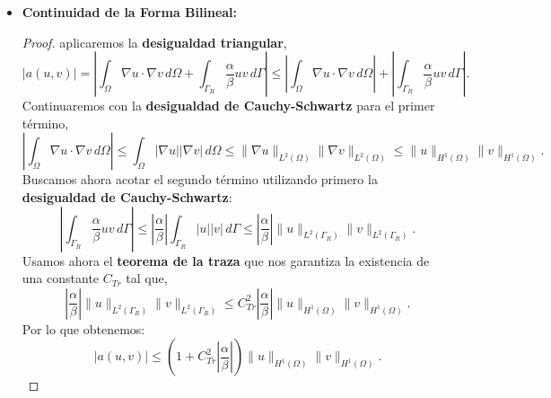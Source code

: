 \documentclass[11pt]{book}
\theoremstyle{plain} %
\theoremstyle{definition} %
\theoremstyle{definition} %
\begin{document}
\begin{itemize}
    \item \textbf{Continuidad de la Forma Bilineal:}\begin{proof} aplicaremos la \textbf{desigualdad triangular},
    \[ | a(u,v) | = \left| \int_{\Omega}\nabla u \cdot \nabla v\, d\Omega + \int_{\Gamma_R}\frac{\alpha}{\beta}uv\, d\Gamma \right| \leq \left| \int_{\Omega}\nabla u \cdot \nabla v\, d\Omega \right| + \left| \int_{\Gamma_R}\frac{\alpha}{\beta}uv\, d\Gamma \right|. \]
    Continuaremos con la \textbf{desigualdad de Cauchy-Schwartz} para el primer término,
    \[ \left| \int_{\Omega}\nabla u \cdot \nabla v\, d\Omega \right| \leq  \int_{\Omega} \left|\nabla u \right| \left|\nabla v \right|\, d\Omega \leq \| \nabla u \|_{L^2(\Omega)}\| \nabla v \|_{L^2(\Omega)} \leq \|  u \|_{H^1(\Omega)}\|  v \|_{H^1(\Omega)} .\]
    Buscamos ahora acotar el segundo término utilizando primero la \textbf{desigualdad de Cauchy-Schwartz}:
    \[ \left| \int_{\Gamma_R}\frac{\alpha}{\beta}uv\, d\Gamma \right| \leq  \left|\frac{\alpha}{\beta}\right|\int_{\Gamma_R}|u||v|\, d\Gamma \leq \left|\frac{\alpha}{\beta}\right| \|  u \|_{L^2(\Gamma_R)}\|  v \|_{L^2(\Gamma_R)} .\]
    Usamos ahora el \textbf{teorema de la traza} que nos garantiza la existencia de una constante $C_{Tr}$ tal que,
    \[ \left|\frac{\alpha}{\beta}\right| \|  u \|_{L^2(\Gamma_R)}\|  v \|_{L^2(\Gamma_R)} \leq C^2_{Tr} \left|\frac{\alpha}{\beta}\right| \|  u \|_{H^1(\Omega)}\|  v \|_{H^1(\Omega)}.\]
    Por lo que obtenemos:
    \[ | a(u,v) | \leq (1+C^2_{Tr}\left|\frac{\alpha}{\beta}\right|) \|u \|_{H^1(\Omega)}\|  v \|_{H^1(\Omega)}.\]
    \end{proof}


\end{itemize}
\end{document}
